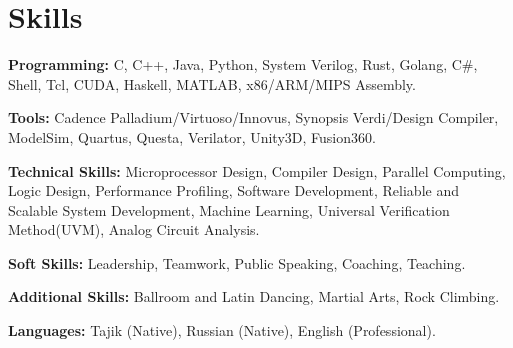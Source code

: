 \documentclass[letterpaper,11pt]{article}
\newcommand{\resumeSubHeadingListStart}{\begin{itemize}[leftmargin=0.15in, label={}]}
\newcommand{\resumeSubHeadingListEnd}{\end{itemize}}
\begin{document}

\section{Skills}
  \vspace{2pt}
  \resumeSubHeadingListStart
    \small{\item{
        \textcolor{secondary_color}{\textbf{Programming:}}{ C, C++, Java, Python, System Verilog, Rust, Golang, C\#, Shell, Tcl, CUDA, Haskell, MATLAB, x86/ARM/MIPS Assembly.} \\ \vspace{3pt}
        
        \textcolor{secondary_color}{\textbf{Tools:}}{ Cadence Palladium/Virtuoso/Innovus, Synopsis Verdi/Design Compiler, ModelSim, Quartus, Questa, Verilator, Unity3D, Fusion360.} \\ \vspace{3pt}

        \textcolor{secondary_color}{\textbf{Technical Skills:}}{ Microprocessor Design, Compiler Design, Parallel Computing, Logic Design, Performance Profiling, Software Development, Reliable and Scalable System Development, Machine Learning, Universal Verification Method(UVM), Analog Circuit Analysis.} \\ \vspace{3pt}
        
        \textcolor{secondary_color}{\textbf{Soft Skills:}}{ Leadership, Teamwork, Public Speaking, Coaching, Teaching.} \\ \vspace{3pt}
        
        \textcolor{secondary_color}{\textbf{Additional Skills:}}{ Ballroom and Latin Dancing, Martial Arts, Rock Climbing.} \\ \vspace{3pt}

        \textcolor{secondary_color}{\textbf{Languages:}}{ Tajik (Native), Russian (Native), English (Professional).}
        
    }}
  \resumeSubHeadingListEnd



\end{document}
